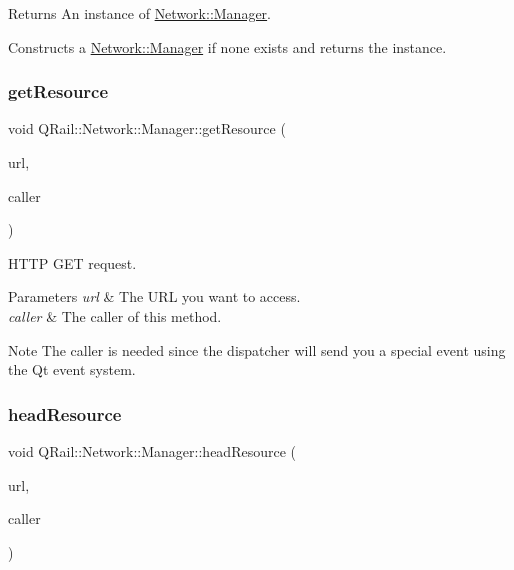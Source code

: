 \begin{DoxyReturn}{Returns}
An instance of \mbox{\hyperlink{classQRail_1_1Network_1_1Manager}{Network\+::\+Manager}}.
\end{DoxyReturn}
Constructs a \mbox{\hyperlink{classQRail_1_1Network_1_1Manager}{Network\+::\+Manager}} if none exists and returns the instance. \mbox{\label{classQRail_1_1Network_1_1Manager_af6dfa87af8f58dc2506ef97247c95037}} 
\subsubsection{\texorpdfstring{getResource}{getResource}}
{\footnotesize\ttfamily void Q\+Rail\+::\+Network\+::\+Manager\+::get\+Resource (\begin{DoxyParamCaption}\item[{const Q\+Url \&}]{url,  }\item[{Q\+Object $\ast$}]{caller }\end{DoxyParamCaption})\hspace{0.3cm}{\ttfamily [slot]}}



H\+T\+TP G\+ET request. 


\begin{DoxyParams}{Parameters}
{\em url} & The U\+RL you want to access. \\
\hline
{\em caller} & The caller of this method. \\
\hline
\end{DoxyParams}
\begin{DoxyNote}{Note}
The caller is needed since the dispatcher will send you a special event using the Qt event system. 
\end{DoxyNote}
\mbox{\label{classQRail_1_1Network_1_1Manager_adde10f409e9b77b59b145fd2609244a7}} 
\subsubsection{\texorpdfstring{headResource}{headResource}}
{\footnotesize\ttfamily void Q\+Rail\+::\+Network\+::\+Manager\+::head\+Resource (\begin{DoxyParamCaption}\item[{const Q\+Url \&}]{url,  }\item[{Q\+Object $\ast$}]{caller }\end{DoxyParamCaption})\hspace{0.3cm}{\ttfamily [slot]}}



